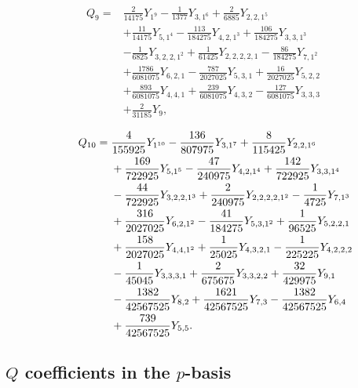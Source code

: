 \documentclass[9pt,twocolumn,twoside]{gsajnl}
\begin{document}
\begin{equation*}
\begin{aligned}
Q_9={}&\frac2{14175}Y_{1^9}
-\frac1{1377}Y_{3,1^6}
+\frac2{6885}Y_{2,2,1^5}
\\
&+\frac{11}{14175}Y_{5,1^4}
-\frac{113}{184275}Y_{4,2,1^3}
+\frac{106}{184275}Y_{3,3,1^3}
\\
&-\frac1{6825}Y_{3,2,2,1^2}
+\frac1{61425}Y_{2,2,2,2,1}
-\frac{86}{184275}Y_{7,1^2}
\\
&+\frac{1786}{6081075}Y_{6,2,1}
-\frac{787}{2027025}Y_{5,3,1}
+\frac{16}{2027025}Y_{5,2,2}
\\
&+\frac{893}{6081075}Y_{4,4,1}
+\frac{239}{6081075}Y_{4,3,2}
-\frac{127}{6081075}Y_{3,3,3}
\\
&+\frac2{31185}Y_{9},
\end{aligned}
\label{eq:Q9-Y}
\end{equation*}

\begin{equation*}
\hspace*{0.78cm}
\begin{aligned}
Q_{10}={}&\frac4{155925}Y_{1^{10}}
-\frac{136}{807975}Y_{3,1^7}
+\frac8{115425}Y_{2,2,1^6}
\\
&+\frac{169}{722925}Y_{5,1^5}
-\frac{47}{240975}Y_{4,2,1^4}
+\frac{142}{722925}Y_{3,3,1^4}
\\
&-\frac{44}{722925}Y_{3,2,2,1^3}
+\frac2{240975}Y_{2,2,2,2,1^2}
-\frac1{4725}Y_{7,1^3}
\\
&+\frac{316}{2027025}Y_{6,2,1^2}
-\frac{41}{184275}Y_{5,3,1^2}
+\frac1{96525}Y_{5,2,2,1}
\\
&+\frac{158}{2027025}Y_{4,4,1^2}
+\frac1{25025}Y_{4,3,2,1}
-\frac1{225225}Y_{4,2,2,2}
\\
&-\frac1{45045}Y_{3,3,3,1}
+\frac2{675675}Y_{3,3,2,2}
+\frac{32}{429975}Y_{9,1}
\\
&-\frac{1382}{42567525}Y_{8,2}
+\frac{1621}{42567525}Y_{7,3}
-\frac{1382}{42567525}Y_{6,4}
\\
&+\frac{739}{42567525}Y_{5,5}.
\end{aligned}
\label{eq:Q10-Y}
\end{equation*}

\subsection{$Q$ coefficients in the $p$-basis}
\end{document}
